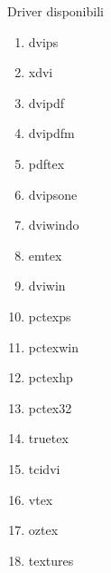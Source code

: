 Driver disponibili
\begin{enumerate}
\item dvips
\item xdvi
\item dvipdf
\item dvipdfm
\item pdftex
\item dvipsone
\item dviwindo
\item emtex
\item dviwin
\item pctexps
\item pctexwin
\item pctexhp
\item pctex32
\item truetex
\item tcidvi
\item vtex
\item oztex
\item textures
\end{enumerate}

